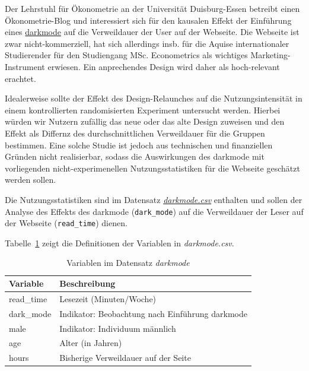 \documentclass[
  a4paper,
  DIV=11,
  oneside]{scrreprt}
\begin{document}
Der Lehrstuhl für Ökonometrie an der Universität Duisburg-Essen betreibt
einen Ökonometrie-Blog und interessiert sich für den kausalen Effekt der
Einführung eines
\href{https://en.wikipedia.org/wiki/Wikipedia:Dark_mode}{darkmode} auf
die Verweildauer der User auf der Webseite. Die Webseite ist zwar
nicht-kommerziell, hat sich allerdings insb. für die Aquise
internationaler Studierender für den Studiengang MSc. Econometrics als
wichtiges Marketing-Instrument erwiesen. Ein anprechendes Design wird
daher als hoch-relevant erachtet.

Idealerweise sollte der Effekt des Design-Relaunches auf die
Nutzungsintensität in einem kontrollierten randomisierten Experiment
untersucht werden. Hierbei würden wir Nutzern zufällig das neue oder das
alte Design zuweisen und den Effekt als Differnz des durchschnittlichen
Verweildauer für die Gruppen bestimmen. Eine solche Studie ist jedoch
aus technischen und finanziellen Gründen nicht realisierbar, sodass die
Auswirkungen des darkmode mit vorliegenden nicht-experimenellen
Nutzungsstatistiken für die Webseite geschätzt werden sollen.

Die Nutzungsstatistiken sind im Datensatz
\href{https://raw.githubusercontent.com/mca91/kasa_data/main/darkmode.csv}{\emph{darkmode.csv}}
enthalten und sollen der Analyse des Effekts des darkmode
(\texttt{dark\_mode}) auf die Verweildauer der Leser auf der Webseite
(\texttt{read\_time}) dienen.

Tabelle~\ref{tbl-darkmode} zeigt die Definitionen der Variablen in
\emph{darkmode.csv}.

\begingroup
\fontsize{12.0pt}{14.4pt}\selectfont

\begin{longtable}{ll}

\caption{\label{tbl-darkmode}Variablen im Datensatz \emph{darkmode}}

\tabularnewline

\toprule
Variable & Beschreibung \\ 
\midrule\addlinespace[2.5pt]
read\_time & Lesezeit (Minuten/Woche) \\ 
dark\_mode & Indikator: Beobachtung nach Einführung darkmode \\ 
male & Indikator: Individuum männlich \\ 
age & Alter (in Jahren) \\ 
hours & Bisherige Verweildauer auf der Seite \\ 
\bottomrule

\end{longtable}
\end{document}
